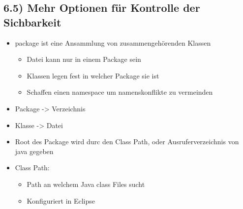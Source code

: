 \documentclass[11pt]{article}
\begin{document}
\subsection{6.5) Mehr Optionen für Kontrolle der Sichbarkeit}
\label{sec:orgb42e39c}
\begin{itemize}
\item package ist eine Ansammlung von zusammengehörenden Klassen\\
\begin{itemize}
\item Datei kann nur in einem Package sein\\
\item Klassen legen fest in welcher Package sie ist\\
\item Schaffen einen namespace um namenskonflikte zu vermeinden\\
\end{itemize}
\item Package -> Verzeichnis\\
\item Klasse -> Datei\\
\item Root des Package wird durc den Class Path, oder Ausruferverzeichnis von java gegeben\\
\item Class Path:\\
\begin{itemize}
\item Path an welchem Java class Files sucht\\
\item Konfiguriert in Eclipse\\
\end{itemize}


\end{itemize}
\end{document}
